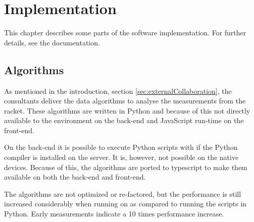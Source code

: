 \chapter{Implementation}
This chapter describes some parts of the software implementation.
For further details, see the documentation.

\section{Algorithms}
As mentioned in the introduction, section \ref{sec:externalCollaboration}, the consultants deliver the data algorithms to analyse the measurements from the racket.
These algorithms are written in Python and because of this not directly available to the  environment on the back-end and JavaScript run-time on the front-end.

On the back-end it is possible to execute Python scripts with  if the Python compiler is installed on the server.
It is, however, not possible on the native devices.
Because of this, the algorithms are ported to \gls{typescript} to make them available on both the back-end and front-end.

The algorithms are not optimized or re-factored, but the performance is still increased considerably when running on  as compared to running the scripts in Python.
Early measurements indicate a 10 times performance increase.
